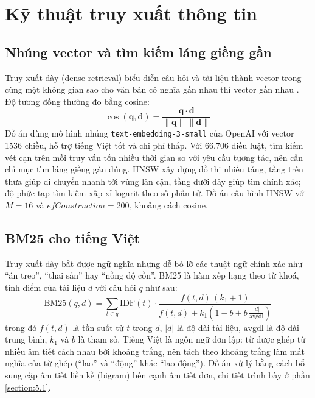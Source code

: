 \documentclass[../DoAn.tex]{subfiles}
\begin{document}
\section{Kỹ thuật truy xuất thông tin}
\label{section:3.3}

\subsection{Nhúng vector và tìm kiếm láng giềng gần}
Truy xuất dày (dense retrieval) biểu diễn câu hỏi và tài liệu thành vector trong cùng một không gian sao cho văn bản có nghĩa gần nhau thì vector gần nhau \cite{karpukhin2020dpr}. Độ tương đồng thường đo bằng cosine:
\begin{equation}\label{eq:cosine}
    \cos(\mathbf{q}, \mathbf{d}) = \frac{\mathbf{q}\cdot\mathbf{d}}{\lVert\mathbf{q}\rVert\,\lVert\mathbf{d}\rVert}
\end{equation}
Đồ án dùng mô hình nhúng \texttt{text-embedding-3-small} của OpenAI với vector 1536 chiều, hỗ trợ tiếng Việt tốt và chi phí thấp. Với 66.706 điều luật, tìm kiếm vét cạn trên mỗi truy vấn tốn nhiều thời gian so với yêu cầu tương tác, nên cần chỉ mục tìm láng giềng gần đúng. HNSW \cite{malkov2020hnsw} xây dựng đồ thị nhiều tầng, tầng trên thưa giúp di chuyển nhanh tới vùng lân cận, tầng dưới dày giúp tìm chính xác; độ phức tạp tìm kiếm xấp xỉ logarit theo số phần tử. Đồ án cấu hình HNSW với $M=16$ và $efConstruction=200$, khoảng cách cosine.

\subsection{BM25 cho tiếng Việt}
Truy xuất dày bắt được ngữ nghĩa nhưng dễ bỏ lỡ các thuật ngữ chính xác như ``án treo'', ``thai sản'' hay ``nồng độ cồn''. BM25 \cite{robertson2009bm25} là hàm xếp hạng theo từ khoá, tính điểm của tài liệu $d$ với câu hỏi $q$ như sau:
\begin{equation}\label{eq:bm25}
    \mathrm{BM25}(q, d) = \sum_{t \in q} \mathrm{IDF}(t)\cdot\frac{f(t,d)\,(k_1+1)}{f(t,d) + k_1\left(1 - b + b\,\frac{|d|}{\mathrm{avgdl}}\right)}
\end{equation}
trong đó $f(t,d)$ là tần suất từ $t$ trong $d$, $|d|$ là độ dài tài liệu, $\mathrm{avgdl}$ là độ dài trung bình, $k_1$ và $b$ là tham số. Tiếng Việt là ngôn ngữ đơn lập: từ được ghép từ nhiều âm tiết cách nhau bởi khoảng trắng, nên tách theo khoảng trắng làm mất nghĩa của từ ghép (``lao'' và ``động'' khác ``lao động''). Đồ án xử lý bằng cách bổ sung cặp âm tiết liền kề (bigram) bên cạnh âm tiết đơn, chi tiết trình bày ở phần \ref{section:5.1}.
\end{document}
